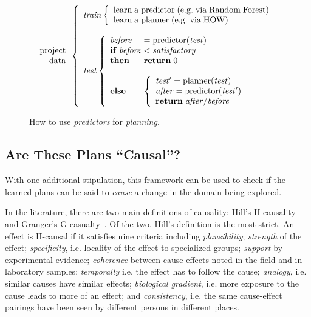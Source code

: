 \documentclass[conference]{IEEEtran}
\begin{document}
{\begin{figure}[!t]
\small 
\[
\begin{array}{r}
\mathrm{project}\\
\mathrm{data}
\end{array} 
\left\{\begin{array}{l}\mathit{train}
        \left\{\begin{array}{l}
                \mathrm{learn\;a\;}\mathrm{predictor\;}\mathrm{(e.g.\;via \;Random\;Forest)}\\
                \mathrm{learn\;a\;}\mathrm{planner\;}\mathrm{(e.g.\;via \; HOW)}
              \end{array}\right.
       \\
      ~\\
\mathit{test}  
    \left\{\begin{array}{l@{~}l}
           \mathit{before}& =\mathrm{predictor}(\mathit{test})\\
           \mathrm{\bf if\;}\mathit{before} & <  \mathit{satisfactory}\\
           \mathrm{\bf then}  & \mathrm{{\bf return}\; 0}\\~\\
           \mathrm{\bf else} &
           \left\{
            \begin{array}{l}
                \mathit{test'} = \mathrm{planner}(\mathit{test})\\
                \mathit{after} =\mathrm{predictor}(\mathit{test'})\\ 
                \mathrm{{\bf return}\;} \mathit{after} /  \mathit{before}
            \end{array}
          \right.
   \end{array}\right.
\end{array} \right. 
\]
 
\caption{How to use {\em predictors} for {\em planning}.}\label{fig:work}
\end{figure}

\subsection{Are These Plans ``Causal''?}
With one additional stipulation,   this framework can be used to check if the learned
plans can be said to {\em cause} a change in the domain being explored.

In the literature, there are two main definitions of causality: Hill's H-causality~\cite{Hill1965}
and Granger's G-casualty~\cite{granger80}. 
Of the two, Hill's definition is the most strict. An effect
is H-causal if it satisfies nine criteria including
{\em  plausibility};
{\em strength} of the effect;
{\em 
specificity}, i.e. locality of the effect
to specialized groups;
{\em
support} by experimental evidence;
{\em 
coherence} between cause-effects noted
in the field and in laboratory samples;
{\em
temporally} i.e. the effect has to follow the cause;
{\em 
analogy}, i.e.  similar causes have similar effects;
{\em
biological gradient}, i.e.  more exposure to the cause leads to more of an
effect; and
{\em
consistency}, i.e.  the same cause-effect pairings have been seen by different persons
in different places.

}
\end{document}
